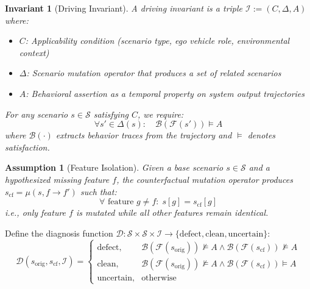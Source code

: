 \documentclass[conference]{IEEEtran}
\theoremstyle{plain}
\newtheorem{assumption}{Assumption}[section]
\newtheorem{invariant}{Invariant}[section]
\begin{document}
\begin{invariant}[Driving Invariant]\label{inv:definition}
A driving invariant is a triple $\mathcal{I} := (C, \Delta, A)$ where:
\begin{itemize}
    \item $C$: Applicability condition (scenario type, ego vehicle role, environmental context)
    \item $\Delta$: Scenario mutation operator that produces a set of related scenarios
    \item $A$: Behavioral assertion as a temporal property on system output trajectories
\end{itemize}
For any scenario $s \in \mathcal{S}$ satisfying $C$, we require:
\begin{equation}
\forall s' \in \Delta(s): \quad \mathcal{B}(\mathcal{F}(s')) \models A
\label{eq:invariant}
\end{equation}
where $\mathcal{B}(\cdot)$ extracts behavior traces from the trajectory and $\models$ denotes satisfaction.
\end{invariant}

\begin{assumption}[Feature Isolation]\label{assump:isolation}
Given a base scenario $s \in \mathcal{S}$ and a hypothesized missing feature $f$, the counterfactual mutation operator produces $s_{\text{cf}} = \mu(s, f \rightarrow f')$ such that:
\begin{equation}
\forall \text{ feature } g \neq f: \; s[g] = s_{\text{cf}}[g]
\label{eq:isolation}
\end{equation}
i.e., only feature $f$ is mutated while all other features remain identical.
\end{assumption}

\begin{definition}\label{def:diagnosis}
Define the diagnosis function $\mathcal{D}: \mathcal{S} \times \mathcal{S} \times \mathcal{I} \rightarrow \{\text{defect}, \text{clean}, \text{uncertain}\}$:
\begin{equation}
\mathcal{D}(s_{\text{orig}}, s_{\text{cf}}, \mathcal{I}) = 
\begin{cases}
\text{defect}, & \mathcal{B}(\mathcal{F}(s_{\text{orig}})) \not\models A \land \mathcal{B}(\mathcal{F}(s_{\text{cf}})) \not\models A \\[4pt]
\text{clean}, & \mathcal{B}(\mathcal{F}(s_{\text{orig}})) \not\models A \land \mathcal{B}(\mathcal{F}(s_{\text{cf}})) \models A \\[4pt]
\text{uncertain}, & \text{otherwise}
\end{cases}
\label{eq:diagnosis}
\end{equation}
\end{definition}
\end{document}
